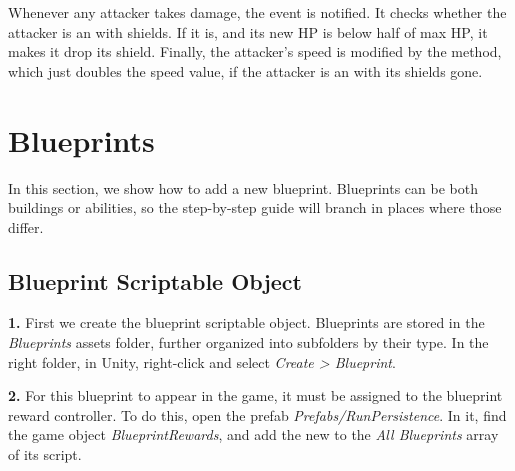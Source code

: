 Whenever any attacker takes damage, the  event is notified.
It checks whether the attacker is an  with shields.
If it is, and its new HP is below half of max HP, it makes it drop its shield.
Finally, the attacker's speed is modified by the  method, which just doubles the speed value, if the attacker is an  with its shields gone.

\section{Blueprints}

In this section, we show how to add a new blueprint.
Blueprints can be both buildings or abilities, so the step-by-step guide will branch in places where those differ.

\subsection{Blueprint Scriptable Object}

\textbf{1.}
First we create the blueprint scriptable object.
Blueprints are stored in the \emph{Blueprints} assets folder, further organized into subfolders by their type.
In the right folder, in Unity, right-click and select \emph{Create > Blueprint}.

\textbf{2.}
For this blueprint to appear in the game, it must be assigned to the blueprint reward controller.
To do this, open the prefab \emph{Prefabs/RunPersistence}.
In it, find the game object \emph{BlueprintRewards}, and add the new  to the \emph{All Blueprints} array of its  script.

